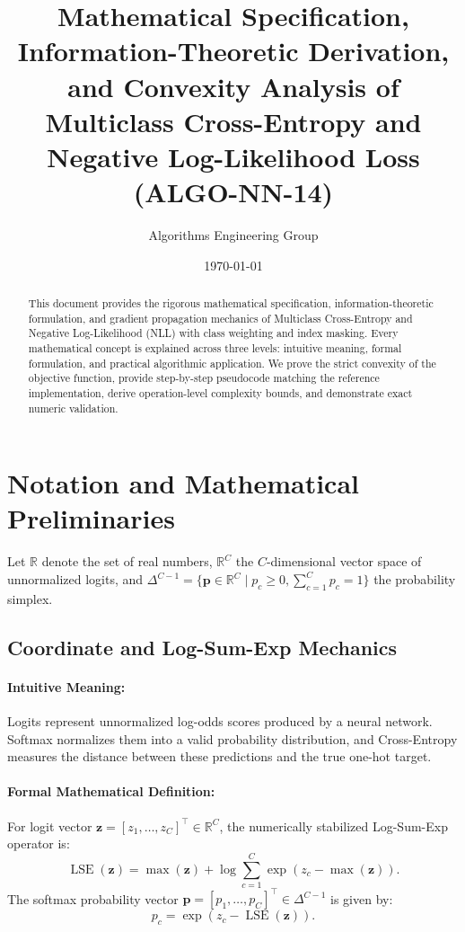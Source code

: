 \documentclass[11pt]{article}
\title{\textbf{Mathematical Specification, Information-Theoretic Derivation, and Convexity Analysis of Multiclass Cross-Entropy and Negative Log-Likelihood Loss (ALGO-NN-14)}}
\author{Algorithms Engineering Group}
\date{\today}
\begin{document}
\maketitle

\begin{abstract}
This document provides the rigorous mathematical specification, information-theoretic formulation, and gradient propagation mechanics of Multiclass Cross-Entropy and Negative Log-Likelihood (NLL) with class weighting and index masking. Every mathematical concept is explained across three levels: intuitive meaning, formal formulation, and practical algorithmic application. We prove the strict convexity of the objective function, provide step-by-step pseudocode matching the reference implementation, derive operation-level complexity bounds, and demonstrate exact numeric validation.
\end{abstract}

\section{Notation and Mathematical Preliminaries}
\label{sec:notation}

Let $\mathbb{R}$ denote the set of real numbers, $\mathbb{R}^C$ the $C$-dimensional vector space of unnormalized logits, and $\Delta^{C-1} = \{\mathbf{p} \in \mathbb{R}^C \mid p_c \ge 0, \sum_{c=1}^C p_c = 1\}$ the probability simplex.

\subsection{Coordinate and Log-Sum-Exp Mechanics}
\paragraph{Intuitive Meaning:} Logits represent unnormalized log-odds scores produced by a neural network. Softmax normalizes them into a valid probability distribution, and Cross-Entropy measures the distance between these predictions and the true one-hot target.

\paragraph{Formal Mathematical Definition:}
For logit vector $\mathbf{z} = [z_1, \dots, z_C]^\top \in \mathbb{R}^C$, the numerically stabilized Log-Sum-Exp operator is:
\begin{equation}
\operatorname{LSE}(\mathbf{z}) = \max(\mathbf{z}) + \log \sum_{c=1}^C \exp(z_c - \max(\mathbf{z})).
\end{equation}
The softmax probability vector $\mathbf{p} = [p_1, \dots, p_C]^\top \in \Delta^{C-1}$ is given by:
\begin{equation}
p_c = \exp(z_c - \operatorname{LSE}(\mathbf{z})).
\end{equation}
\end{document}
